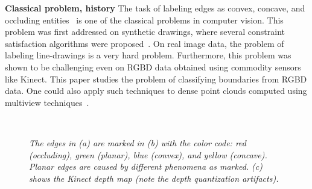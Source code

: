 


\textbf{Classical problem, history}
The task of labeling edges as convex, concave, and occluding entities~\cite{kanade1981recovery,Koenderink1984,lineCurvedObjects,mild-sugihara}
is one of the classical problems in computer vision. This problem was first addressed on synthetic drawings, where several 
constraint satisfaction algorithms were proposed~\cite{mild-sugihara}. On real image data, the problem of labeling 
line-drawings is a very hard problem. Furthermore, this problem was shown to be challenging even on RGBD data obtained 
using commodity sensors like Kinect. This paper studies the problem of classifying boundaries from RGBD data. 
One could also apply such techniques to dense point clouds computed using multiview 
techniques~\cite{furukawa-PAMI10,Snavely2006}. 
\begin{figure}[t]
\centering
        \hfill
        \hfill
        \\
\caption{\it The edges in (a) are marked in (b) with the color code: red (occluding), green (planar),
blue (convex), and yellow (concave). Planar edges are caused by different phenomena as marked.
(c) shows the Kinect depth map (note the depth quantization artifacts).}
\label{fig:EdgeLabeling}
\end{figure}	

